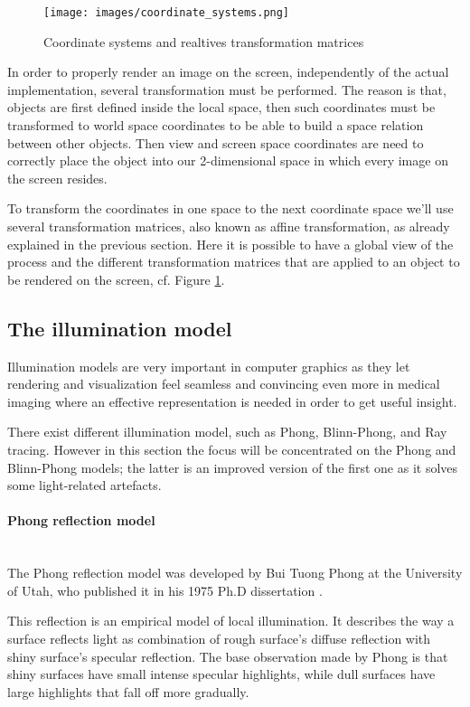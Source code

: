 \documentclass[12pt,a4paper]{extarticle}
\newcommand{\myparagraph}[1]{\paragraph{#1}\mbox{}\\}
\begin{document}
\begin{figure}[hbtp]
\centering
\texttt{[image: images/coordinate\_systems.png]}
\caption{Coordinate systems and realtives transformation matrices}
\label{fig:coordinate_systems}
\end{figure}

In order to properly render an image on the screen, independently of the actual implementation, several transformation must be performed. The reason is that, objects are first defined inside the local space, then such coordinates must be transformed to world space coordinates to be able to build a space relation between other objects. Then view and screen space coordinates are need to correctly place the object into our 2-dimensional space in which every image on the screen resides.


To transform the coordinates in one space to the next coordinate space we'll use several transformation matrices, also known as affine transformation, as already explained in the previous section.
Here it is possible to have a global view of the process and the different transformation matrices that are applied to an object to be rendered on the screen, cf. Figure \ref{fig:coordinate_systems}.

\pagebreak
\subsection{The illumination model} %
Illumination models are very important in computer graphics as they let rendering and visualization feel seamless and convincing even more in medical imaging where an effective representation is needed in order to get useful insight.
 
There exist different illumination model, such as Phong, Blinn-Phong, and Ray tracing. However in this section the focus will be concentrated on the Phong and Blinn-Phong models; the latter is an improved version of the first one as it solves some light-related artefacts.

\myparagraph{Phong reflection model} The Phong reflection model was developed by Bui Tuong Phong at the University of Utah, who published it in his 1975 Ph.D dissertation \cite{phong_1975}.

This reflection is an empirical model of local illumination. It describes the way a surface reflects light as combination of rough surface's diffuse reflection with shiny surface's specular reflection. The base observation made by Phong is that shiny surfaces have small intense specular highlights, while dull surfaces have large highlights that fall off more gradually. 
\end{document}
